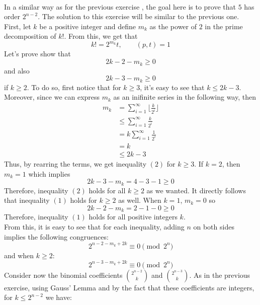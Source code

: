 \begin{solution}
    \\ In a similar way as for the previous exercise , the goal here is to prove that $5$ has order $2^{n-2}$. The solution to this exercise will be similar to the previous one. First, let $k$ be a positive integer and define $m_k$ as the power of $2$ in the prime decomposition of $k!$. From this, we get that
    $$k! = 2^{m_k}t, \qquad (p,t)=1$$
    Let's prove show that
    \begin{equation} \tag{1}
        2k - 2 - m_k \geq 0
    \end{equation}
    and also
    \begin{equation} \tag{2}
        2k - 3 - m_k \geq 0
    \end{equation}
    if $k \geq 2$. To do so, first notice that for $k \geq 3$, it's easy to see that $k \leq 2k - 3$. Moreover, since we can express $m_k$ as an inifinite series in the following way, then
    \begin{align*}
        m_k &= \sum_{i=1}^{\infty} \biggl \lfloor \frac{k}{2^i} \biggr \rfloor \\
        &\leq \sum_{i=1}^{\infty}\frac{k}{2^i} \\
        &= k \sum_{i=1}^{\infty}\frac{1}{2^i} \\
        &= k \\
        &\leq 2k - 3
    \end{align*}
    Thus, by rearring the terms, we get inequality $(2)$ for $k \geq 3$. If $k=2$, then $m_k = 1$ which implies 
    $$2k - 3 - m_k = 4 - 3 - 1 \geq 0$$
    Therefore, inequality $(2)$ holds for all $k \geq 2$ as we wanted. It directly follows that inequality $(1)$ holds for $k \geq 2$ as well. When $k=1$, $m_k = 0$ so
    $$2k - 2 - m_k = 2 - 1 - 0 \geq 0$$
    Therefore, inequality $(1)$ holds for all positive integers $k$. \\
    From this, it is easy to see that for each inequality, adding $n$ on both sides implies the following congruences:
    \begin{equation}\tag{3}
        2^{n - 2 - m_k + 2k} \equiv 0 \pmod{2^n}
    \end{equation}
    and when $k \geq 2$:
    \begin{equation}\tag{4}
        2^{n - 3 - m_k + 2k} \equiv 0 \pmod{2^n}
    \end{equation}
    Consider now the binomial coefficients $\binom{2^{n-2}}{k}$ and $\binom{2^{n-3}}{k}$. As in the previous exercise, using Gauss' Lemma and by the fact that these coefficients are integers, for $k \leq 2^{n-2}$ we have:

\end{solution}
